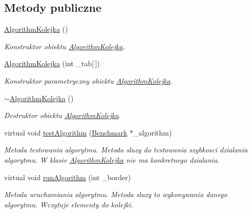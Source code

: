 \subsection*{Metody publiczne}
\begin{DoxyCompactItemize}
\item 
\hyperlink{class_algorithm_kolejka_a024b4d14ce3e46ad167fa1961168088e}{Algorithm\-Kolejka} ()
\begin{DoxyCompactList}\small\item\em Konstruktor obiektu \hyperlink{class_algorithm_kolejka}{Algorithm\-Kolejka}. \end{DoxyCompactList}\item 
\hyperlink{class_algorithm_kolejka_a734671abcf48ef75dd1df980b503e618}{Algorithm\-Kolejka} (int \-\_\-tab\mbox{[}$\,$\mbox{]})
\begin{DoxyCompactList}\small\item\em Konstruktor parametryczny obiektu \hyperlink{class_algorithm_kolejka}{Algorithm\-Kolejka}. \end{DoxyCompactList}\item 
\hyperlink{class_algorithm_kolejka_a1df769a80bf632f57437c8d0cf6874d2}{$\sim$\-Algorithm\-Kolejka} ()
\begin{DoxyCompactList}\small\item\em Destruktor obiektu \hyperlink{class_algorithm_kolejka}{Algorithm\-Kolejka}. \end{DoxyCompactList}\item 
virtual void \hyperlink{class_algorithm_kolejka_ac739a8c865d4b71232549d12e0f1f466}{test\-Algorithm} (\hyperlink{class_benchmark}{Benchmark} $\ast$\-\_\-algorithm)
\begin{DoxyCompactList}\small\item\em Metoda testowania algorytmu. Metoda sluzy do testowania szybkosci dzialania algorytmu. W klasie \hyperlink{class_algorithm_kolejka}{Algorithm\-Kolejka} nie ma konkretnego dzialania. \end{DoxyCompactList}\item 
virtual void \hyperlink{class_algorithm_kolejka_ae9da3f1862fd90feb4a3c1d6b4f3dd8d}{run\-Algorithm} (int \-\_\-border)
\begin{DoxyCompactList}\small\item\em Metoda uruchamiania algorytmu. Metoda sluzy to wykonywania danego algorytmu. Wczytuje elementy do kolejki. \end{DoxyCompactList}\end{DoxyCompactItemize}
